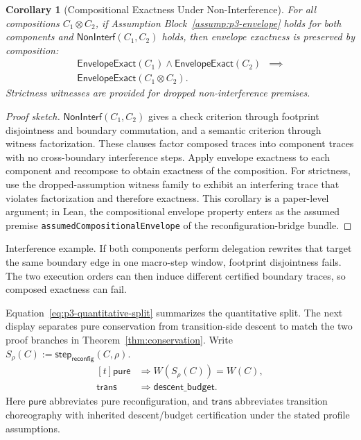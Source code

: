 \documentclass[a4paper,10pt,twocolumn,english]{article}
\numberwithin{equation}{section}
\theoremstyle{paperdef}
\theoremstyle{paperplain}
\newtheorem{corollary}[definition]{Corollary}
\theoremstyle{paperdef}
\theoremstyle{paperremark}
\theoremstyle{paperdef}
\newcommand{\EnvelopeExact}{\ensuremath{\mathsf{EnvelopeExact}}}
\begin{document}
\begin{corollary}[Compositional Exactness Under Non-Interference]
	\label{cor:compositional}
	For all compositions $C_1 \otimes C_2$, if Assumption Block~\ref{assump:p3-envelope} holds for both components and $\mathsf{NonInterf}(C_1,C_2)$ holds, then envelope exactness is preserved by composition:
	\begin{equation}
		\begin{aligned}
			\EnvelopeExact(C_1) \land \EnvelopeExact(C_2)
			 & \implies \\
			\EnvelopeExact(C_1 \otimes C_2).
		\end{aligned}
	\end{equation}
	Strictness witnesses are provided for dropped non-interference premises.
\end{corollary}

\begin{proof}[Proof sketch]
	$\mathsf{NonInterf}(C_1,C_2)$ gives a check criterion through footprint disjointness and boundary commutation, and a semantic criterion through witness factorization. These clauses factor composed traces into component traces with no cross-boundary interference steps. Apply envelope exactness to each component and recompose to obtain exactness of the composition. For strictness, use the dropped-assumption witness family to exhibit an interfering trace that violates factorization and therefore exactness.
	This corollary is a paper-level argument; in Lean, the compositional envelope property enters as the assumed premise \texttt{assumedCompositionalEnvelope} of the reconfiguration-bridge bundle.
\end{proof}

Interference example. If both components perform delegation rewrites that target the same boundary edge in one macro-step window, footprint disjointness fails. The two execution orders can then induce different certified boundary traces, so composed exactness can fail.

Equation~\ref{eq:p3-quantitative-split} summarizes the quantitative split.
The next display separates pure conservation from transition-side descent to
match the two proof branches in Theorem~\ref{thm:conservation}.
Write $S_\rho(C):=\mathsf{step}_{\mathsf{reconfig}}(C,\rho)$.
\begin{equation}
	\label{eq:p3-quantitative-split}
	\begin{aligned}[t]
		\mathsf{pure}  & \Rightarrow W(S_\rho(C)) = W(C),      \\
		\mathsf{trans} & \Rightarrow \mathsf{descent\_budget}.
	\end{aligned}
\end{equation}
Here $\mathsf{pure}$ abbreviates pure reconfiguration, and $\mathsf{trans}$ abbreviates transition choreography with inherited descent/budget certification under the stated profile assumptions.
\end{document}
